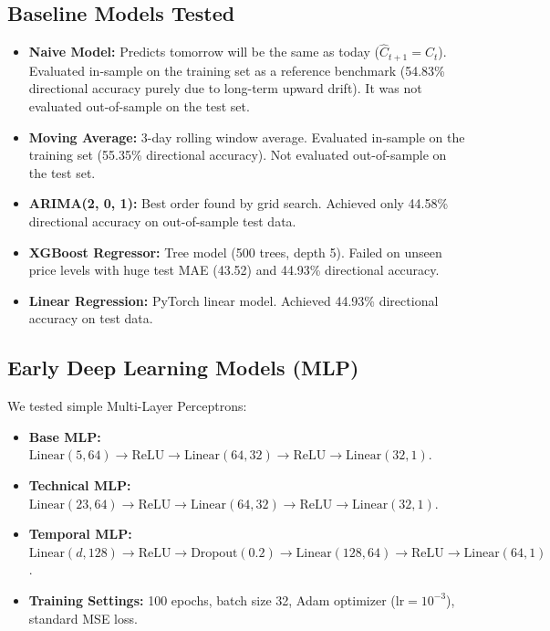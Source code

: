 \subsection{Baseline Models Tested}
\begin{itemize}[leftmargin=1.5cm, itemsep=1pt]
	\item \textbf{Naive Model:} Predicts tomorrow will be the same as today ($\hat{C}_{t+1} = C_t$). Evaluated in-sample on the training set as a reference benchmark (54.83\% directional accuracy purely due to long-term upward drift). It was not evaluated out-of-sample on the test set.
	\item \textbf{Moving Average:} 3-day rolling window average. Evaluated in-sample on the training set (55.35\% directional accuracy). Not evaluated out-of-sample on the test set.
	\item \textbf{ARIMA(2, 0, 1):} Best order found by grid search. Achieved only 44.58\% directional accuracy on out-of-sample test data.
	\item \textbf{XGBoost Regressor:} Tree model (500 trees, depth 5). Failed on unseen price levels with huge test MAE (43.52) and 44.93\% directional accuracy.
	\item \textbf{Linear Regression:} PyTorch linear model. Achieved 44.93\% directional accuracy on test data.
\end{itemize}

\subsection{Early Deep Learning Models (MLP)}
We tested simple Multi-Layer Perceptrons:
\begin{itemize}[leftmargin=1.5cm, itemsep=1pt]
	\item \textbf{Base MLP:} $\text{Linear}(5, 64) \rightarrow \text{ReLU} \rightarrow \text{Linear}(64, 32) \rightarrow \text{ReLU} \rightarrow \text{Linear}(32, 1)$.
	\item \textbf{Technical MLP:} $\text{Linear}(23, 64) \rightarrow \text{ReLU} \rightarrow \text{Linear}(64, 32) \rightarrow \text{ReLU} \rightarrow \text{Linear}(32, 1)$.
	\item \textbf{Temporal MLP:} $\text{Linear}(d, 128) \rightarrow \text{ReLU} \rightarrow \text{Dropout}(0.2) \rightarrow \text{Linear}(128, 64) \rightarrow \text{ReLU} \rightarrow \text{Linear}(64, 1)$.
	\item \textbf{Training Settings:} 100 epochs, batch size 32, Adam optimizer ($\text{lr}=10^{-3}$), standard MSE loss.
\end{itemize}

